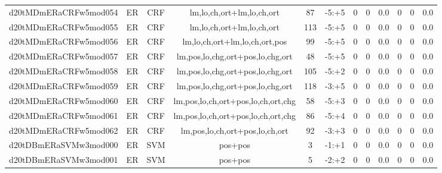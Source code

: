 \documentclass[a4paper]{article}
\begin{document}
\begin{landscape}
\begin{center}
\begin{tabular}{ |c|c|c|c|c|c|c|c|c|c|c|c|}
 
 	
 	\small{ d20tMDmERaCRFw5mod054 } & ER & CRF & lm,lo,ch,ort+lm,lo,ch,ort  &  87 &  -5:+5  &  0 & 0 & 0.0  &  0 & 0 & 0.0 \\
 	

 
 	
 	\small{ d20tMDmERaCRFw5mod055 } & ER & CRF & lm,lo,ch,ort+lm,lo,ch,ort  &  113 &  -5:+5  &  0 & 0 & 0.0  &  0 & 0 & 0.0 \\
 	

 
 	
 	\small{ d20tMDmERaCRFw5mod056 } & ER & CRF & lm,lo,ch,ort+lm,lo,ch,ort,pos  &  99 &  -5:+5  &  0 & 0 & 0.0  &  0 & 0 & 0.0 \\
 	

 
 	
 	\small{ d20tMDmERaCRFw5mod057 } & ER & CRF & lm,pos,lo,chg,ort+pos,lo,chg,ort  &  48 &  -5:+5  &  0 & 0 & 0.0  &  0 & 0 & 0.0 \\
 	

 
 	
 	\small{ d20tMDmERaCRFw5mod058 } & ER & CRF & lm,pos,lo,chg,ort+pos,lo,chg,ort  &  105 &  -5:+2  &  0 & 0 & 0.0  &  0 & 0 & 0.0 \\
 	

 
 	
 	\small{ d20tMDmERaCRFw5mod059 } & ER & CRF & lm,pos,lo,chg,ort+pos,lo,chg,ort  &  118 &  -3:+5  &  0 & 0 & 0.0  &  0 & 0 & 0.0 \\
 	

 
 	
 	\small{ d20tMDmERaCRFw5mod060 } & ER & CRF & lm,pos,lo,ch,ort+pos,lo,ch,ort,chg  &  58 &  -5:+3  &  0 & 0 & 0.0  &  0 & 0 & 0.0 \\
 	

 
 	
 	\small{ d20tMDmERaCRFw5mod061 } & ER & CRF & lm,pos,lo,ch,ort+pos,lo,ch,ort,chg  &  86 &  -5:+4  &  0 & 0 & 0.0  &  0 & 0 & 0.0 \\
 	

 
 	
 	\small{ d20tMDmERaCRFw5mod062 } & ER & CRF & lm,pos,lo,ch,ort+pos,lo,ch,ort  &  92 &  -3:+3  &  0 & 0 & 0.0  &  0 & 0 & 0.0 \\
 	

 
 	
 	\small{ d20tDBmERaSVMw3mod000 } & ER & SVM & pos+pos  &  3 &  -1:+1  &  0 & 0 & 0.0  &  0 & 0 & 0.0 \\
 	

 
 	
 	\small{ d20tDBmERaSVMw3mod001 } & ER & SVM & pos+pos  &  5 &  -2:+2  &  0 & 0 & 0.0  &  0 & 0 & 0.0 \\
 	

\end{tabular}
\end{center}
\end{landscape}
\end{document}
